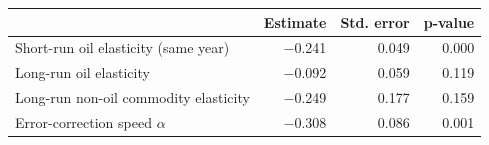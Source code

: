 \begin{tabular}{lrrr}
\toprule
 & Estimate & Std. error & p-value \\
\midrule
Short-run oil elasticity (same year) & $-$0.241 & 0.049 & 0.000 \\
Long-run oil elasticity & $-$0.092 & 0.059 & 0.119 \\
Long-run non-oil commodity elasticity & $-$0.249 & 0.177 & 0.159 \\
Error-correction speed $\alpha$ & $-$0.308 & 0.086 & 0.001 \\
\bottomrule
\end{tabular}
